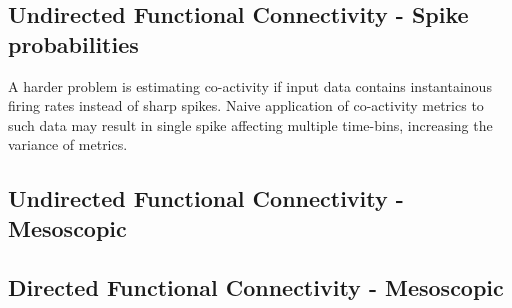 \documentclass[a4paper,10pt]{article}
\begin{document}
\newpage
\subsection{Undirected Functional Connectivity - Spike probabilities}

A harder problem is estimating co-activity if input data contains instantainous firing rates instead of sharp spikes. Naive application of co-activity metrics to such data may result in single spike affecting multiple time-bins, increasing the variance of metrics.

\newpage
\subsection{Undirected Functional Connectivity - Mesoscopic}

\newpage
\subsection{Directed Functional Connectivity - Mesoscopic}
\end{document}
